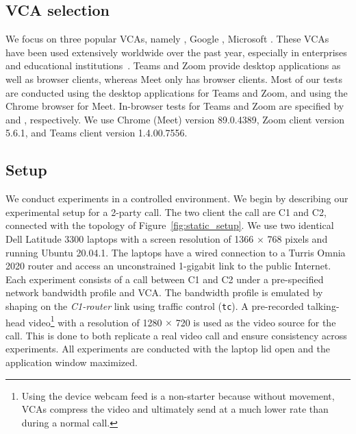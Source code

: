 







\subsection{VCA selection} 
We focus on three popular VCAs, namely \zoom, Google \meet, Microsoft \teams. These VCAs have been used extensively worldwide over the past year, especially in enterprises and educational institutions~\cite{vca_share}. %
Teams and Zoom provide desktop applications as well as browser clients, whereas Meet only has browser clients. Most of our tests are conducted using the desktop applications for Teams and Zoom, and using the Chrome browser for Meet. In-browser tests for Teams and Zoom are specified by \textit{\teamsbrowser} and \textit{\zoombrowser}, respectively. We use Chrome (Meet) version 89.0.4389, Zoom client version 5.6.1, and Teams client version 1.4.00.7556.



\subsection{Setup}
\label{subsec:setup}


We conduct experiments in a controlled environment.
We begin by describing our experimental setup for a 2-party call.
The two client the call are C1 and C2,
  connected with the topology of Figure~\ref{fig:static_setup}.
We use two identical Dell Latitude 3300 laptops with a screen resolution of 1366 $\times$ 768 pixels and running Ubuntu 20.04.1. The laptops have a wired connection to a Turris Omnia 2020
router and access an unconstrained 1-gigabit link to the public Internet.
Each experiment consists of a call between C1 and C2 under a pre-specified network bandwidth profile and VCA. The bandwidth profile is emulated by shaping on the \textit{C1-router} link using traffic control (\texttt{tc}). A
pre-recorded talking-head video\footnote{Using the device webcam feed is a non-starter because without movement, VCAs compress the video and ultimately send at a much
lower rate than during a normal call.} with a resolution of 1280 $\times$ 720 is used as the video source for the call. This is done to both replicate a real video call
and ensure consistency across experiments. All experiments are conducted with the laptop lid open and the application window maximized. %

